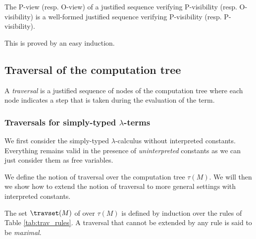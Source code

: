\begin{property}
\label{proper:pview_visibility}
The P-view (resp. O-view) of a justified sequence verifying P-visibility (resp. O-visibility)
is a well-formed justified sequence verifying P-visibility (resp. P-visibility).
\end{property}
This is proved by an easy induction.


\subsection{Traversal of the computation tree}
\label{subsec:traversal}
A \emph{traversal} is a justified sequence of nodes of the computation tree where each node indicates a step that is taken during the evaluation of the term.

\subsubsection{Traversals for simply-typed $\lambda$-terms}

We first consider the simply-typed $\lambda$-calculus without interpreted constants.
Everything remains valid in the presence of \emph{uninterpreted} constants as we can just
consider them as free variables.

We define the notion of traversal over the computation tree $\tau(M)$.
We will then we show how to extend the notion of traversal to more general settings with interpreted constants.

\begin{definition} \rm
\label{def:traversal} The set $\travset(M)$ of 
over $\tau(M)$ is defined by induction over the rules of Table \ref{tab:trav_rules}.
A traversal that cannot be extended by any rule is said to be \emph{maximal}.
\end{definition}

